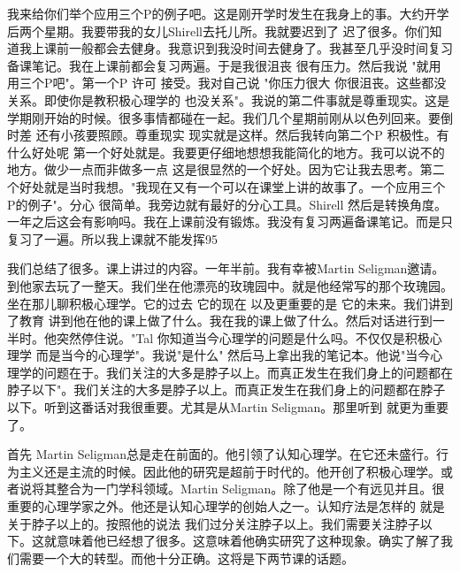 我来给你们举个应用三个P的例子吧。这是刚开学时发生在我身上的事。大约开学后两个星期。我要带我的女儿Shirell去托儿所。我就要迟到了 迟了很多。你们知道我上课前一般都会去健身。我意识到我没时间去健身了。我甚至几乎没时间复习备课笔记。我在上课前都会复习两遍。于是我很沮丧 很有压力。然后我说 "就用用三个P吧"。第一个P 许可 接受。我对自己说 "你压力很大 你很沮丧。这些都没关系。即使你是教积极心理学的 也没关系"。我说的第二件事就是尊重现实。这是学期刚开始的时候。很多事情都碰在一起。我们几个星期前刚从以色列回来。要倒时差 还有小孩要照顾。尊重现实 现实就是这样。然后我转向第二个P 积极性。有什么好处呢 第一个好处就是。我要更仔细地想想我能简化的地方。我可以说不的地方。做少一点而非做多一点 这是很显然的一个好处。因为它让我去思考。第二个好处就是当时我想。"我现在又有一个可以在课堂上讲的故事了。一个应用三个P的例子"。分心 很简单。我旁边就有最好的分心工具。Shirell 然后是转换角度。一年之后这会有影响吗。我在上课前没有锻炼。我没有复习两遍备课笔记。而是只复习了一遍。所以我上课就不能发挥95%

我们总结了很多。课上讲过的内容。一年半前。我有幸被Martin Seligman邀请。到他家去玩了一整天。我们坐在他漂亮的玫瑰园中。就是他经常写的那个玫瑰园。坐在那儿聊积极心理学。它的过去 它的现在 以及更重要的是 它的未来。我们讲到了教育 讲到他在他的课上做了什么。我在我的课上做了什么。然后对话进行到一半时。他突然停住说。"Tal 你知道当今心理学的问题是什么吗。不仅仅是积极心理学 而是当今的心理学"。我说"是什么" 然后马上拿出我的笔记本。他说"当今心理学的问题在于。我们关注的大多是脖子以上。而真正发生在我们身上的问题都在脖子以下"。我们关注的大多是脖子以上。而真正发生在我们身上的问题都在脖子以下。听到这番话对我很重要。尤其是从Martin Seligman。那里听到 就更为重要了。 

首先 Martin Seligman总是走在前面的。他引领了认知心理学。在它还未盛行。行为主义还是主流的时候。因此他的研究是超前于时代的。他开创了积极心理学。或者说将其整合为一门学科领域。Martin Seligman。除了他是一个有远见并且。很重要的心理学家之外。他还是认知心理学的创始人之一。认知疗法是怎样的 就是关于脖子以上的。按照他的说法 我们过分关注脖子以上。我们需要关注脖子以下。这就意味着他已经想了很多。这意味着他确实研究了这种现象。确实了解了我们需要一个大的转型。而他十分正确。这将是下两节课的话题。 

